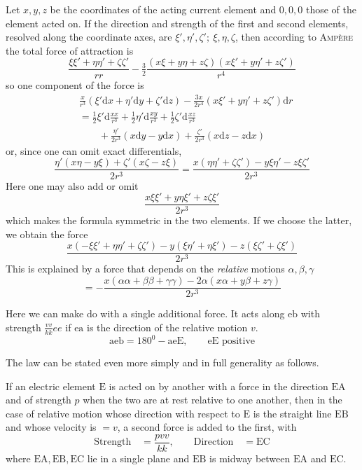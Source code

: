 Let $x,y,z$ be the coordinates of the acting current element and $0,0,0$ those of the element acted on. If the direction and strength of the first and second elements, resolved along the coordinate axes, are $\xi',\eta',\zeta';\ \xi,\eta,\zeta$, then according to \textsc{Ampère} the total force of attraction is
\[
\frac{\xi\xi'+\eta\eta'+\zeta\zeta'}{rr}-\tfrac{3}{2}\frac{(x\xi+y\eta+z\zeta)(x\xi'+y\eta'+z\zeta')}{r^4}
\]
so one component of the force is
\[
\begin{aligned}
&\frac{x}{r^3}(\xi'\mathrm dx+\eta'\mathrm dy+\zeta'\mathrm dz)-\frac{3x}{2r^4}(x\xi'+y\eta'+z\zeta')\mathrm dr\\[5pt]
&=\tfrac{1}{2}\xi'\mathrm d\frac{xx}{r^3}+\tfrac{1}{2}\eta'\mathrm d\frac{xy}{r^3}+\tfrac{1}{2}\zeta'\mathrm d\frac{xz}{r^3}\\
&\qquad+\frac{\eta'}{2r^3}(x\mathrm dy-y\mathrm dx)+\frac{\zeta'}{2r^3}(x\mathrm dz-z\mathrm dx)
\end{aligned}
\]
or, since one can omit exact differentials,
\[
\frac{\eta'(x\eta-y\xi)+\zeta'(x\zeta-z\xi)}{2r^3}=\frac{x(\eta\eta'+\zeta\zeta')-y\xi\eta'-z\xi\zeta'}{2r^3}
\]
Here one may also add or omit
\[
\frac{x\xi\xi'+y\eta\xi'+z\zeta\xi'}{2r^3}
\]
which makes the formula symmetric in the two elements. If we choose the latter, we obtain the force
\[
\frac{x(-\xi\xi'+\eta\eta'+\zeta\zeta')-y(\xi\eta'+\eta\xi')-z(\xi\zeta'+\zeta\xi')}{2r^3}
\]
This is explained by a force that depends on the \textit{relative} motions $\alpha,\beta,\gamma$
\[
=-\frac{x(\alpha\alpha+\beta\beta+\gamma\gamma)-2\alpha(x\alpha+y\beta+z\gamma)}{2r^3}
\]

Here we can make do with a single additional force. It acts along $\mathrm{eb}$ with strength $\frac{vv}{kk}ee$ if $\mathrm{ea}$ is the direction of the relative motion $v$.
\[
\mathrm{aeb}=180^0-\mathrm{aeE},\qquad\mathrm{eE}\text{ positive}
\]
\begin{center}\end{center}

The law can be stated even more simply and in full generality as follows.
\begin{center}\end{center}

If an electric element $\mathrm E$ is acted on by another with a force in the direction $\mathrm{EA}$ and of strength $p$ when the two are at rest relative to one another, then in the case of relative motion whose direction%
%
 with respect to $\mathrm E$ is the straight line $\mathrm{EB}$ and whose velocity is $=v$, a second force is added to the first, with
\[
\text{Strength}\quad=\frac{pvv}{kk},\qquad\text{Direction}\quad=\mathrm{EC}
\]
where $\mathrm{EA,EB,EC}$ lie in a single plane and $\mathrm{EB}$ is midway between $\mathrm{EA}$ and $\mathrm{EC}$.


